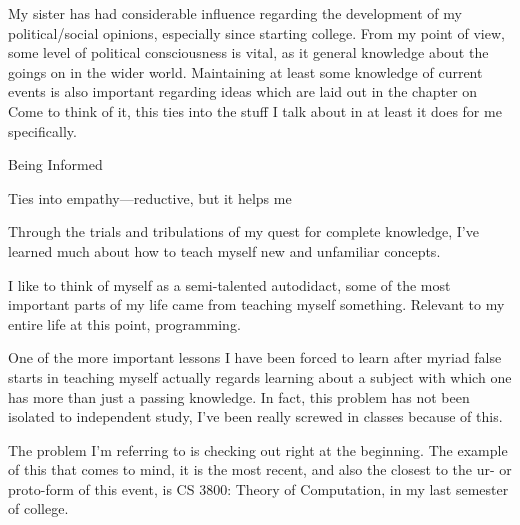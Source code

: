 \documentclass[../butidigress.tex]{subfiles}
\begin{document}
My sister has had considerable influence regarding the development of my political/social opinions, especially since starting college.
From my point of view, some level of political consciousness is vital, as it general knowledge about the goings on in the wider world.
Maintaining at least some knowledge of current events is also important regarding ideas which are laid out in the chapter on 
Come to think of it, this ties into the stuff I talk about in  at least it does for me specifically.

\begin{somenotes}{Being Informed}
    \item Ties into empathy---reductive, but it helps me 
\end{somenotes}

Through the trials and tribulations of my quest for complete knowledge, I've learned much about how to teach myself new and unfamiliar concepts.

I like to think of myself as a semi-talented autodidact, some of the most important parts of my life came from teaching myself something.
Relevant to my entire life at this point, programming.

One of the more important lessons I have been forced to learn after myriad false starts in teaching myself actually regards learning about a subject with which one has more than just a passing knowledge.
In fact, this problem has not been isolated to independent study, I've been really screwed in classes because of this.

The problem I'm referring to is checking out right at the beginning.
The example of this that comes to mind, it is the most recent, and also the closest to the ur- or proto-form of this event, is CS 3800: Theory of Computation, in my last semester of college.
\end{document}
